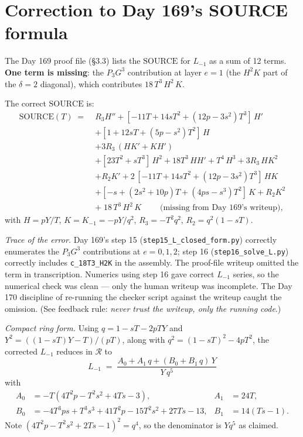 \documentclass[11pt]{article}
\newcommand{\R}{\mathcal{R}}
\newcommand{\SOURCE}{\mathrm{SOURCE}}
\begin{document}
\section{Correction to Day 169's SOURCE formula}

The Day 169 proof file (\S 3.3) lists the $\SOURCE$ for $L_{-1}$ as a sum of 12 terms. \textbf{One term is missing}: the $P_3 G^3$ contribution at layer $e=1$ (the $H^2 K$ part of the $\delta=2$ diagonal), which contributes $18\, T^3\, H^2\, K$.

The correct $\SOURCE$ is:
\begin{align*}
\SOURCE(T) \;=\;& R_3 H'' + [-11T + 14sT^2 + (12p - 3s^2) T^3]\, H' \\
&+ [1 + 12 s T + (5 p - s^2) T^2]\, H \\
&+ 3 R_3\, (H K' + K H') \\
&+ [23 T^2 + s T^3]\, H^2 + 18 T^3\, H H' + T^4\, H^3 + 3 R_3\, H K^2 \\
&+ R_2 K' + 2\,[-11T + 14 s T^2 + (12p - 3s^2) T^3]\, H K \\
&+ [-s + (2s^2 + 10 p) T + (4 p s - s^3) T^2]\, K + R_2 K^2 \\
&+ \boxed{\;18\, T^3\, H^2\, K\;} \qquad \text{(missing from Day 169's writeup)},
\end{align*}
with $H = pY/T$, $K = K_{-1} = -pY/q^2$, $R_3 = -T^2 q^2$, $R_2 = q^2(1 - sT)$.

\emph{Trace of the error.} Day 169's step 15 (\texttt{step15\_L\_closed\_form.py}) correctly enumerates the $P_3 G^3$ contributions at $e=0,1,2$; step 16 (\texttt{step16\_solve\_L.py}) correctly includes \texttt{c\_18T3\_H2K} in the assembly. The proof-file writeup omitted the term in transcription. Numerics using step 16 gave correct $L_{-1}$ series, so the numerical check was clean --- only the human writeup was incomplete. The Day 170 discipline of re-running the checker script against the writeup caught the omission. (See feedback rule: \emph{never trust the writeup, only the running code}.)

\emph{Compact ring form.} Using $q = 1 - sT - 2pTY$ and $Y^2 = ((1-sT)Y - T)/(pT)$, along with $q^2 = (1-sT)^2 - 4 p T^2$, the corrected $L_{-1}$ reduces in $\R$ to
$$L_{-1} \;=\; \frac{A_0 + A_1\, q + (B_0 + B_1\, q)\, Y}{Y\, q^5}$$
with
\begin{align*}
A_0 &= -T(4 T^2 p - T^2 s^2 + 4 T s - 3), & A_1 &= 24 T,\\
B_0 &= -4 T^3 p s + T^3 s^3 + 41 T^2 p - 15 T^2 s^2 + 27 T s - 13, & B_1 &= 14(T s - 1).
\end{align*}
Note $(4 T^2 p - T^2 s^2 + 2 T s - 1)^2 = q^4$, so the denominator is $Y q^5$ as claimed.
\end{document}
